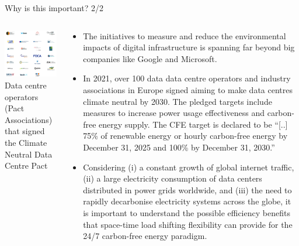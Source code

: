 \begin{frame}{Why is this important? 2/2}

  {\footnotesize

  \begin{columns}[T]

    \begin{column}{6cm}
      \centering
      \vspace{.5cm}
      \includegraphics[width=6cm]{images/climateneutraldatacentre.png}
      {\scriptsize
      Data centre operators (Pact Associations) that signed \\ 
      the Climate Neutral Data Centre Pact}
    \end{column}

    \begin{column}{9cm}

      \begin{itemize}
        \item  The initiatives to measure and reduce the environmental impacts of digital infrastructure is spanning far beyond big companies like Google and  Microsoft.
        
        \item In 2021, over 100 data data centre operators and industry associations in Europe signed  aiming to make data centres climate neutral by 2030. The pledged targets include measures to increase power usage effectiveness and carbon-free energy supply. The CFE target is declared to be \enquote{[..] 75\% of renewable energy or hourly carbon-free energy by December 31, 2025 and 100\% by December 31, 2030.} 

        \item Considering (i) a constant growth of global internet traffic, (ii) a large electricity consumption of data centers distributed in power grids worldwide, and (iii) the need to rapidly decarbonise electricity systems across the globe, it is \alert{important to understand the possible efficiency benefits that space-time load shifting flexibility can provide for the 24/7 carbon-free energy paradigm}. 

      \end{itemize}
      \end{column}
  

    \end{columns}

  }
\end{frame}



